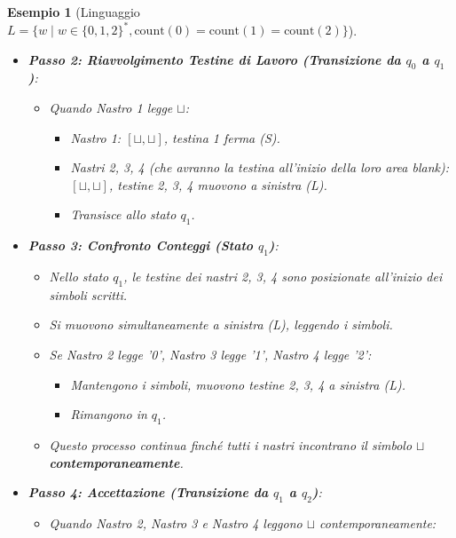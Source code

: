 \documentclass[a4paper, 11pt]{book} %
\newtheorem{example}[theorem]{Esempio}
\theoremstyle{definition}
\begin{document}
\begin{example}[Linguaggio $L = \{w \mid w \in \{0,1,2\}^*, \text{count}(0)=\text{count}(1)=\text{count}(2)\}$]
\begin{itemize}
\begin{itemize}
            \item Questo continua finché il Nastro 1 non incontra $\sqcup$.
        \end{itemize}
    \item \textbf{Passo 2: Riavvolgimento Testine di Lavoro (Transizione da $q_0$ a $q_1$)}:
        \begin{itemize}
            \item Quando Nastro 1 legge $\sqcup$:
                \begin{itemize}
                    \item Nastro 1: $[\sqcup, \sqcup]$, testina 1 ferma (S).
                    \item Nastri 2, 3, 4 (che avranno la testina all'inizio della loro area blank): $[\sqcup, \sqcup]$, testine 2, 3, 4 muovono a sinistra (L).
                    \item Transisce allo stato $q_1$.
                \end{itemize}
        \end{itemize}
    \item \textbf{Passo 3: Confronto Conteggi (Stato $q_1$)}:
        \begin{itemize}
            \item Nello stato $q_1$, le testine dei nastri 2, 3, 4 sono posizionate all'inizio dei simboli scritti.
            \item Si muovono simultaneamente a sinistra (L), leggendo i simboli.
            \item Se Nastro 2 legge '0', Nastro 3 legge '1', Nastro 4 legge '2':
                \begin{itemize}
                    \item Mantengono i simboli, muovono testine 2, 3, 4 a sinistra (L).
                    \item Rimangono in $q_1$.
                \end{itemize}
            \item Questo processo continua finché tutti i nastri incontrano il simbolo $\sqcup$ \textbf{contemporaneamente}.
        \end{itemize}
    \item \textbf{Passo 4: Accettazione (Transizione da $q_1$ a $q_2$)}:
        \begin{itemize}
            \item Quando Nastro 2, Nastro 3 e Nastro 4 leggono $\sqcup$ contemporaneamente:
                \begin{itemize}

\end{itemize}
\end{itemize}
\end{itemize}
\end{example}
\end{document}
